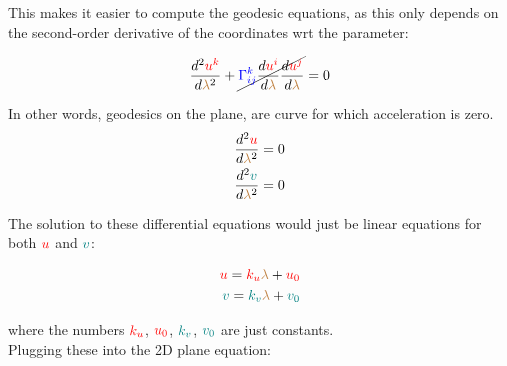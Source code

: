 This makes it easier to compute the geodesic equations, as this only depends on the second-order derivative of the coordinates wrt the parameter:

\begin{align*}
    \frac{d^2 \begingroup\color{red}u^k\endgroup}{d\begingroup\color{brown}\lambda\endgroup^2} + \cancel{\begingroup\color{blue}\Gamma^{k}_{ij}\endgroup \frac{d \begingroup\color{red}u^i\endgroup}{d\begingroup\color{brown}\lambda\endgroup} \frac{d \begingroup\color{red}u^j\endgroup}{d\begingroup\color{brown}\lambda\endgroup}} = 0 
\end{align*}

In other words, geodesics on the plane, are curve for which acceleration is zero.\\

\begin{align*}
    \frac{d^2 \begingroup\color{red}u\endgroup}{d\begingroup\color{brown}\lambda\endgroup^2} &= 0\\
    \frac{d^2 \begingroup\color{teal}v\endgroup}{d\begingroup\color{brown}\lambda\endgroup^2} &= 0
\end{align*}

The solution to these differential equations would just be linear equations for both $\color{red}u$ and $\color{teal}v$:

\begin{align*}
    \begingroup\color{red}u\endgroup = \begingroup\color{red}k_u\endgroup\begingroup\color{brown}\lambda\endgroup + \begingroup\color{red}u_0\endgroup\\
    \begingroup\color{teal}v\endgroup = \begingroup\color{teal}k_v\endgroup\begingroup\color{brown}\lambda\endgroup + \begingroup\color{teal}v_0\endgroup
\end{align*}

where the numbers $\color{red}k_u$, $\color{red}u_0$, $\color{teal}k_v$, $\color{teal}v_0$ are just constants.\\
Plugging these into the 2D plane equation:

